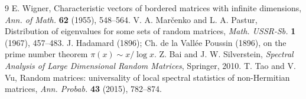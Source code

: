 \documentclass[11pt]{article}
\begin{document}
\begin{thebibliography}{9}
 E. Wigner, Characteristic vectors of bordered matrices with infinite
dimensions, \emph{Ann. of Math.} \textbf{62} (1955), 548--564.
 V. A. Mar\v{c}enko and L. A. Pastur, Distribution of eigenvalues for some
sets of random matrices, \emph{Math. USSR-Sb.} \textbf{1} (1967), 457--483.
 J. Hadamard (1896); Ch. de la Vall\'ee Poussin (1896), on the prime
number theorem $\pi(x)\sim x/\log x$.
 Z. Bai and J. W. Silverstein, \emph{Spectral Analysis of Large
Dimensional Random Matrices}, Springer, 2010.
 T. Tao and V. Vu, Random matrices: universality of local spectral
statistics of non-Hermitian matrices, \emph{Ann. Probab.} \textbf{43} (2015), 782--874.
\end{thebibliography}
\end{document}
